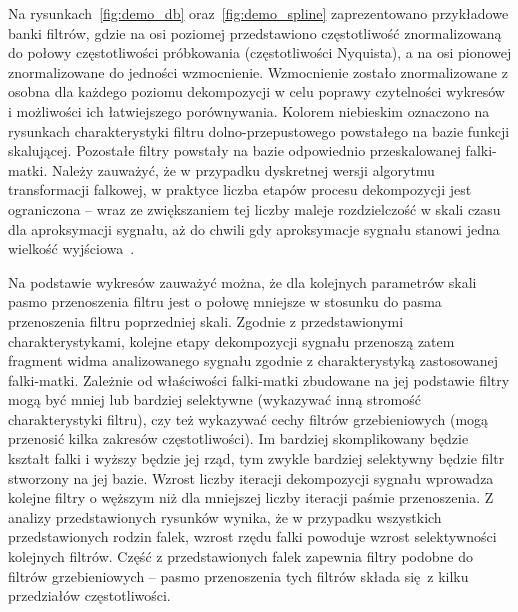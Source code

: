 Na rysunkach~\ref{fig:demo_db} oraz~\ref{fig:demo_spline} zaprezentowano przykładowe banki filtrów, gdzie na osi poziomej przedstawiono częstotliwość znormalizowaną do połowy częstotliwości próbkowania (częstotliwości Nyquista), a na osi pionowej znormalizowane do jedności wzmocnienie. Wzmocnienie zostało znormalizowane z osobna dla każdego poziomu dekompozycji w celu poprawy czytelności wykresów i możliwości ich łatwiejszego porównywania. Kolorem niebieskim oznaczono na rysunkach charakterystyki filtru dolno-przepustowego powstałego na bazie funkcji skalującej. Pozostałe filtry powstały na bazie odpowiednio przeskalowanej falki-matki. Należy zauważyć, że w przypadku dyskretnej wersji algorytmu transformacji falkowej, w praktyce liczba etapów procesu dekompozycji jest ograniczona -- wraz ze zwiększaniem tej liczby maleje rozdzielczość w skali czasu dla aproksymacji sygnału, aż do chwili gdy aproksymacje sygnału stanowi jedna wielkość wyjściowa~\cite{wallen_handbook}.

Na podstawie wykresów zauważyć można, że dla kolejnych parametrów skali pasmo przenoszenia filtru jest o połowę mniejsze w stosunku do pasma przenoszenia filtru poprzedniej skali. Zgodnie z przedstawionymi charakterystykami, kolejne etapy dekompozycji sygnału przenoszą zatem fragment widma analizowanego sygnału zgodnie z charakterystyką zastosowanej falki-matki. Zależnie od właściwości falki-matki zbudowane na jej podstawie filtry mogą być mniej lub bardziej selektywne (wykazywać inną stromość charakterystyki filtru), czy też wykazywać cechy filtrów grzebieniowych (mogą przenosić kilka zakresów częstotliwości). Im bardziej skomplikowany będzie kształt falki i wyższy będzie jej rząd, tym zwykle bardziej selektywny będzie filtr stworzony na jej bazie. Wzrost liczby iteracji dekompozycji sygnału wprowadza kolejne filtry o węższym niż dla mniejszej liczby iteracji paśmie przenoszenia. Z analizy przedstawionych rysunków wynika, że w przypadku wszystkich przedstawionych rodzin falek, wzrost rzędu falki powoduje wzrost selektywności kolejnych filtrów. Część z przedstawionych falek zapewnia filtry podobne do filtrów grzebieniowych -- pasmo przenoszenia tych filtrów składa się z kilku przedziałów częstotliwości.

